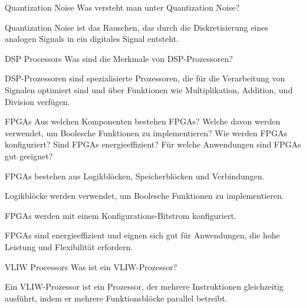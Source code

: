 \documentclass{article}
\begin{document}
\begin{exercise}{Quantization Noise}
  Was versteht man unter Quantization Noise?

  \begin{solution}
    Quantization Noise ist das Rauschen, das durch die Diskretisierung eines analogen Signals in ein digitales Signal entsteht.
  \end{solution}
\end{exercise}

\begin{exercise}{DSP Processors}
  Was sind die Merkmale von DSP-Prozessoren?

  \begin{solution}
    DSP-Prozessoren sind spezialisierte Prozessoren, die für die Verarbeitung von Signalen optimiert sind und über Funktionen wie Multiplikation, Addition, und Division verfügen.
  \end{solution}
\end{exercise}

\begin{exercise}{FPGAs}
  Aus welchen Komponenten bestehen FPGAs? Welche davon werden verwendet, um Boolesche Funktionen zu implementieren? Wie werden FPGAs konfiguriert? Sind FPGAs energieeffizient? Für welche Anwendungen sind FPGAs gut geeignet?

  \begin{solution}
    FPGAs bestehen aus Logikblöcken, Speicherblöcken und Verbindungen.

    Logikblöcke werden verwendet, um Boolesche Funktionen zu implementieren.

    FPGAs werden mit einem Konfigurations-Bitstrom konfiguriert.

    FPGAs sind energieeffizient und eignen sich gut für Anwendungen, die hohe Leistung und Flexibilität erfordern.
  \end{solution}
\end{exercise}

\begin{exercise}{VLIW Processors}
  Was ist ein VLIW-Prozessor?

  \begin{solution}
    Ein VLIW-Prozessor ist ein Prozessor, der mehrere Instruktionen gleichzeitig ausführt, indem er mehrere Funktionsblöcke parallel betreibt.
  \end{solution}
\end{exercise}
\end{document}

